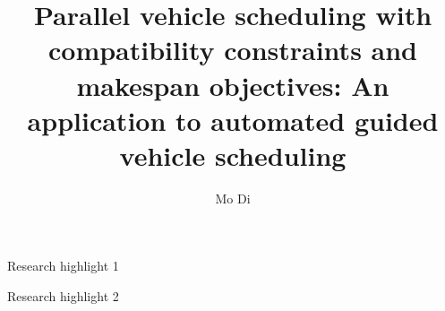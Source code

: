\documentclass[preprint,12pt,authoryear]{elsarticle}
\begin{document}
\begin{frontmatter}



\title{Parallel vehicle scheduling 
with compatibility constraints and makespan objectives: 
An application to automated guided vehicle  scheduling}


\author{Mo Di}


\begin{abstract}

\end{abstract}

\begin{graphicalabstract}
\end{graphicalabstract}

\begin{highlights}
\item Research highlight 1
\item Research highlight 2
\end{highlights}


\end{frontmatter}
\end{document}
